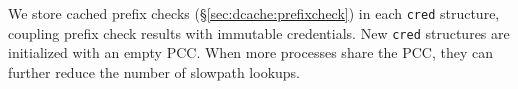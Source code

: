 
We store cached prefix checks (\S\ref{sec:dcache:prefixcheck}) in each  {\tt cred} structure,
coupling prefix check results with immutable credentials.
New {\tt cred} structures are initialized with an empty PCC.
When more processes share the PCC, they can further reduce the number of slowpath lookups.








